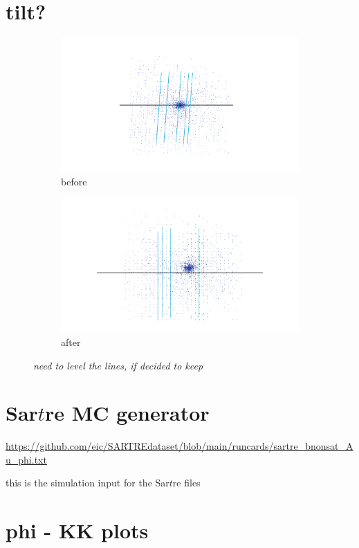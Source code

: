 \section{tilt?}
\begin{figure}[H]
    \begin{subfigure}{.48\linewidth}
        \centering
        \includegraphics[width=\linewidth]{img/orig_config_clusters.pdf}
        \caption{before}
        \label{fig:work:tilt:before}
    \end{subfigure}
    \begin{subfigure}{.48\linewidth}
        \centering
        \includegraphics[width=\linewidth]{img/every_rot_removed_clusters.pdf}
        \caption{after}
        \label{fig:work:tilt:after}  
    \end{subfigure}
    \caption{\textit{need to level the lines, if decided to keep}}
    \label{fig:work:tilt}
\end{figure}

\section{Sar$t$re MC generator}

\url{https://github.com/eic/SARTREdataset/blob/main/runcards/sartre_bnonsat_Au_phi.txt}

this is the simulation input for the Sar$t$re files

\section{phi - KK plots}